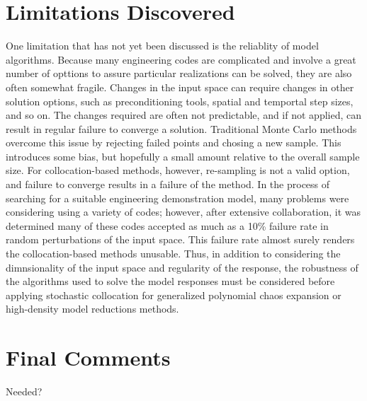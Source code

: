 \section{Limitations Discovered}
One limitation that has not yet been discussed is the reliablity of model algorithms.  Because many engineering codes are
complicated and involve a great number of opttions to assure particular realizations can be solved, they are also often
somewhat fragile.  Changes in the input space can require changes in other solution options, such as preconditioning tools,
spatial and temportal step sizes, and so on.  The changes required are often not predictable, and if not applied, can result
in regular failure to converge a solution.  Traditional Monte Carlo methods overcome this issue by rejecting failed points and
chosing a new sample.  This introduces some bias, but hopefully a small amount relative to the overall sample size.  For
collocation-based methods, however, re-sampling is not a valid option, and failure to converge results in a failure of the method.
In the process of searching for a suitable engineering demonstration model, many problems were considering using a variety of
codes; however, after extensive collaboration, it was determined many of these codes accepted as much as a 10\% failure rate
in random perturbations of the input space.  This failure rate almost surely renders the collocation-based methods
unusable.  Thus, in addition to considering the dimnsionality of the input space and regularity of the response, the
robustness of the algorithms used to solve the model responses must be considered before applying stochastic collocation for
generalized polynomial chaos expansion or high-density model reductions methods.

\section{Final Comments}
Needed?
